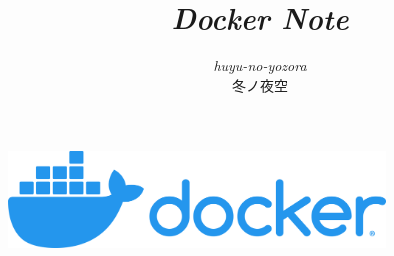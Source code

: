\documentclass[10pt,a4j,openany,dvipdfmx]{jsarticle}
\title{{\it Docker Note}}
\author{{\it huyu-no-yozora }\\冬ノ夜空}
\date{\todaye}
\begin{document}
\maketitle
\begin{center}
\includegraphics[width=10cm]{./figure/horizontal-logo-monochromatic-white.png}
\end{center}

\tableofcontents

\newpage



\newpage






\end{document}
